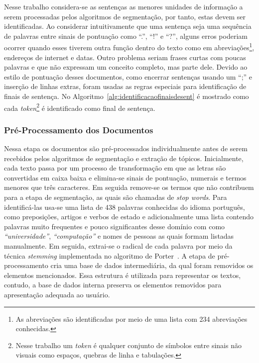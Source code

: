 Nesse trabalho considera-se as sentenças as menores unidades de informação a serem processadas pelos algoritmos de segmentação, por tanto, estas devem ser identificadas. Ao considerar intuitivamente que uma sentença seja uma sequência de palavras entre sinais de pontuação como ``.'', ``!'' e ``?'', alguns erros poderiam ocorrer quando esses tiverem outra função dentro do texto como em abreviações\footnote{As abreviações são identificadas por meio de uma lista com 234 abreviações conhecidas.}, endereços de internet e datas. Outro problema seriam frases curtas com poucas palavras e que não expressam um conceito completo, mas parte dele. Devido ao estilo de pontuação desses documentos, como encerrar sentenças usando um ``;'' e inserção de linhas extras, foram usadas as regras especiais para identificação de finais de sentença. No Algoritmo~\ref{alg:identificacaofinaisdesent} é mostrado como cada \textit{token}\footnote{Nesse trabalho um \textit{token} é qualquer conjunto de símbolos entre sinais não visuais como espaços, quebras de linha e tabulações.} é identificado  como final de sentença.  %







\subsubsection{Pré-Processamento dos Documentos}



Nessa etapa os documentos são pré-processados individualmente antes de serem recebidos pelos algoritmos de segmentação e extração de tópicos. Inicialmente, cada texto passa por um processo de transformação em que as letras são convertidas em caixa baixa e elimina-se sinais de pontuação, numerais e termos menores que três caracteres. Em seguida remove-se os termos que não contribuem para a etapa de segmentação, as quais são chamadas de \textit{stop words}. Para identificá-las usa-se uma lista de 438 palavras conhecidas do idioma português, como preposições, artigos e verbos de estado e adicionalmente uma lista contendo palavras muito frequentes e pouco significantes desse domínio com como \textit{``universidade''}, \textit{``computação''} e nomes de pessoas as quais formam listadas manualmente. Em seguida, extrai-se o radical de cada palavra por meio da técnica \textit{stemming} implementada no algoritmo de Porter~\cite{Porter1997}. A etapa de pré-processamento cria uma base de dados intermediária, da qual foram removidos os elementos mencionados. Essa estrutura é utilizada para representar os textos, contudo, a base de dados interna preserva os elementos removidos para apresentação adequada ao usuário.
 
